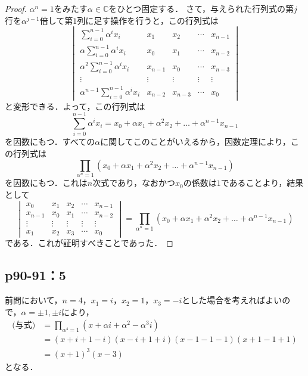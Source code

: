 \documentclass[uplatex,dvipdfmx,a4paper,11pt,fleqn]{jsarticle}
\begin{document}
\begin{leftbar}
    \begin{proof}
    $\alpha ^n =1$をみたす$\alpha \in \mathbb{C}$をひとつ固定する．
    さて，与えられた行列式の第$j$行を$\alpha^{j-1}$倍して第$1$列に足す操作を行うと，この行列式は
    \[
        \begin{vmatrix}
            \sum_{i=0}^{n-1} \alpha^i x_i & x_1 & x_2 & \cdots & x_{n-1} \\
            \alpha \sum_{i=0}^{n-1} \alpha^i x_i & x_0 & x_1 & \cdots & x_{n-2} \\
            \alpha^2 \sum_{i=0}^{n-1} \alpha^i x_i & x_{n-1} & x_0 & \cdots & x_{n-3} \\
            \vdots & \vdots & \vdots & \vdots & \vdots  \\
            \alpha^{n-1} \sum_{i=0}^{n-1} \alpha^i x_i & x_{n-2} & x_{n-3} & \cdots & x_0 
        \end{vmatrix}
    \]
    と変形できる．よって，この行列式は
    \[
        \sum_{i=0}^{n-1} \alpha^i x_i = x_0 + \alpha x_1 + \alpha^2 x_2 + \dots +\alpha^{n-1} x_{n-1}
    \]
    を因数にもつ．すべての$\alpha$に関してこのことがいえるから，因数定理により，この行列式は
    \[
        \prod_{\alpha^n=1} (x_0 + \alpha x_1 + \alpha^2 x_2 + \dots +\alpha^{n-1} x_{n-1})
    \]
を因数にもつ．これは$n$次式であり，なおかつ$x_0$の係数は$1$であることより，結果として
\[
   \begin{vmatrix} 
    x_0 & x_1 & x_2 & \cdots & x_{n-1} \\
    x_{n-1} & x_0 & x_1 & \cdots & x_{n-2} \\
    \vdots & \vdots & \vdots & \vdots & \vdots \\
    x_1 & x_2 & x_3 & \cdots & x_0 
   \end{vmatrix} 
   =  \prod_{\alpha^n=1} (x_0 + \alpha x_1 + \alpha^2 x_2 + \dots +\alpha^{n-1} x_{n-1})
\]
である．これが証明すべきことであった．
\end{proof}
\end{leftbar}


\subsection*{p90-91：5}

\begin{leftbar} 
    前問において，$n=4$，$x_1 = i$，$x_2 = 1$，$x_3=-i$とした場合を考えればよいので，$\alpha = \pm 1 , \pm i$により，
    \begin{align*} 
        \text{(与式)} & = \prod_{\alpha^4=1} (x+ \alpha i +\alpha^2 -  \alpha^3i ) \\
        & = (x+i+1-i) (x-i+1+i)(x-1-1-1)(x+1-1+1) \\
        & =(x+1)^3(x-3)
    \end{align*} 
    となる．
\end{leftbar}
\end{document}
